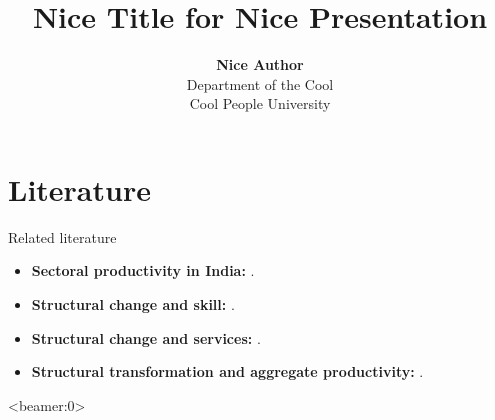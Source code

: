 \documentclass[10pt,xcolor={svgnames}]{beamer}
\begin{document}
\title[]{\textbf{Nice Title for Nice Presentation}}
\author[Nice Author]{\textbf{Nice Author} \\
Department of the Cool \\
Cool People University}
\date[]{}

\AtBeginSection[]{\frame{\sectionpage}}
\AtBeginSubsection[]{\frame{\subsectionpage}}

\begin{frame}
	\titlepage
\end{frame}

\section{Literature}

\begin{frame}{Related literature}
	\begin{itemize}
		\item \textbf{Sectoral productivity in India:} \citep{rodrik2004hindugrowth,sivasubramonian2004humancapital,hsieh2009misallocation,broadberry2010historical,eichengreen2011servicegrowth,verma2012tfp,ziebarth2013misallocation,garciasantana2014reservationlaws}.
		\item \textbf{Structural change and skill:} \citep{buera2018skillbiasedstructchange,herrendorf2018humancapital,herrendorf2019China,herrendorf2015endogenous}.
		\item \textbf{Structural change and services:} \citep{buera2012service,duernecker2017structural,duarte2019pricesproductivity}.
		\item \textbf{Structural transformation and aggregate productivity:} \citep{ngai2007structural,restuccia2008aggregateproductivity,duarte2010aggregateproductivity,rodrik2016premature,mcmillanrodrik2014africa}.
	\end{itemize}
\end{frame}

\begin{frame}<beamer:0>


\end{frame}
\end{document}
